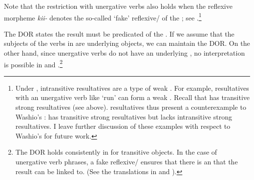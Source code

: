 \documentclass[output=paper]{LSP/langsci}
\begin{document}
\begin{exe}
\ex\label{ex:rosen:20}
\begin{xlist}



\end{xlist}
\end{exe}

Note that the restriction with unergative verbs also holds when the reflexive morpheme \textit{kii-} denotes the so-called `fake' reflexive/ of the ; see .\footnote{Under  , intransitive resultatives are a type of weak . For example, resultatives with an unergative verb like `run' can form a weak . Recall that  has transitive strong resultatives (see  above).  resultatives thus present a counterexample to Washio's :  has transitive strong resultatives but lacks intransitive strong resultatives. I leave further discussion of these examples with respect to Washio's  for future work.}

\begin{exe}


\end{exe}

The DOR states the result must be predicated of the . If we assume that the subjects of the verbs in  are underlying objects, we can maintain the DOR. On the other hand, since unergative verbs do not have an underlying , no  interpretation is possible in  and .\footnote{The DOR holds consistently in  for transitive objects. In the case of unergative verb phrases, a fake reflexive/ ensures that there is an  that the result can be linked to. (See the translations in  and ).}
\end{document}
